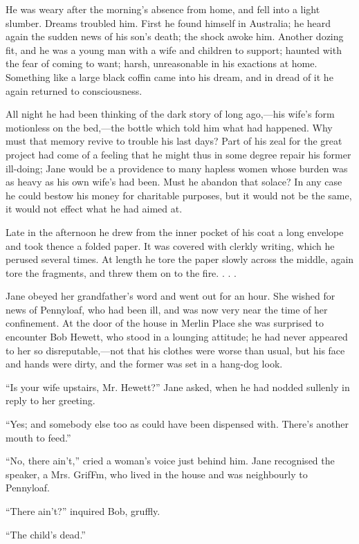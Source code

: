 He was weary after the morning's absence from home, and fell into a
light slumber. Dreams troubled him. First he found himself in Australia;
he heard again the sudden news of his son's death; the shock awoke him.
Another dozing fit, and he was a young man with a wife and children to
support; haunted with the fear of coming to want; harsh, unreasonable in
his exactions at home. Something like a large black coffin came into his
dream, and in dread of it he again returned to consciousness.

All night he had been thinking of the dark story of long ago,---his
wife's form motionless on the bed,---the bottle which told him what had
happened. Why must that memory revive to trouble his last days? Part of
his zeal for the great project had come of a feeling that he might thus
in some degree repair his former ill-doing; Jane would be a providence
to many hapless women whose burden was as heavy as {}his own wife's had
been. Must he abandon that solace? In any case he could bestow his money
for charitable purposes, but it would not be the same, it would not
effect what he had aimed at.

Late in the afternoon he drew from the inner pocket of his coat a long
envelope and took thence a folded paper. It was covered with clerkly
writing, which he perused several times. At length he tore the paper
slowly across the middle, again tore the fragments, and threw them on to
the fire. . . .

Jane obeyed her grandfather's word and went out for an hour. She wished
for news of Pennyloaf, who had been ill, and was now very near the time
of her confinement. At the door of the house in Merlin Place she was
surprised to encounter Bob Hewett, who stood in a lounging attitude; he
had never appeared to her so disreputable,---not that his clothes were
worse than usual, but his face and hands were dirty, and the former was
set in a hang-dog look.

``Is your wife upstairs, Mr. Hewett?'' Jane asked, when he had nodded
sullenly in reply to her greeting.

{}``Yes; and somebody else too as could have been dispensed with.
There's another mouth to feed.''

``No, there ain't,'' cried a woman's voice just behind him. Jane
recognised the speaker, a Mrs. GrifFm, who lived in the house and was
neighbourly to Pennyloaf.

``There ain't?'' inquired Bob, gruffly.

``The child's dead.''

